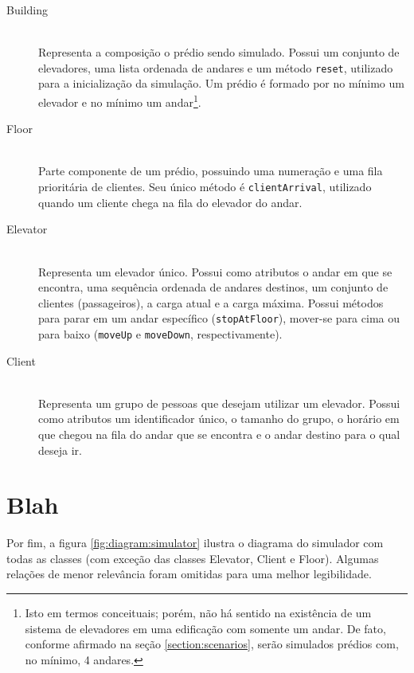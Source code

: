 \begin{description}
  \item[Building] \hfill \\
    Representa a composição o prédio sendo simulado. Possui um conjunto de
    elevadores, uma lista ordenada de andares e um método \texttt{reset},
    utilizado para a inicialização da simulação. Um prédio é formado por no
    mínimo um elevador e no mínimo um andar\footnote{Isto em termos conceituais;
    porém, não há sentido na existência de um sistema de elevadores em uma
    edificação com somente um andar. De fato, conforme afirmado na seção
    \ref{section:scenarios}, serão simulados prédios com, no mínimo, 4
    andares.}.

  \item[Floor] \hfill \\
    Parte componente de um prédio, possuindo uma numeração e uma fila
    prioritária de clientes. Seu único método é \texttt{clientArrival},
    utilizado quando um cliente chega na fila do elevador do andar.

\item[Elevator] \hfill \\
    Representa um elevador único. Possui como atributos o andar em que se
    encontra, uma sequência ordenada de andares destinos, um conjunto de
    clientes (passageiros), a carga atual e a carga máxima. Possui métodos para
    parar em um andar específico (\texttt{stopAtFloor}), mover-se para cima ou
    para baixo (\texttt{moveUp} e \texttt{moveDown}, respectivamente).

\item[Client] \hfill \\
    Representa um grupo de pessoas que desejam utilizar um elevador. Possui como atributos um identificador único, o tamanho do grupo, o horário em que chegou na fila do andar que se encontra e o andar destino para o qual deseja ir.

\end{description}

\section{Blah}

Por fim, a figura \ref{fig:diagram:simulator} ilustra o diagrama do simulador
com todas as classes (com exceção das classes Elevator, Client e Floor). Algumas
relações de menor relevância foram omitidas para uma melhor legibilidade.

